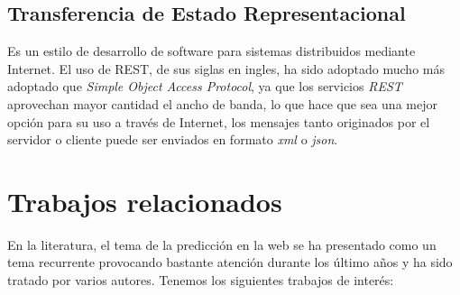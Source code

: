 \subsection{Transferencia de Estado Representacional}

Es un estilo de desarrollo de software para sistemas distribuidos mediante Internet. El uso de REST, de sus siglas en ingles, ha sido adoptado mucho más adoptado que  \emph{Simple Object Access Protocol}, ya que los servicios \emph{REST} aprovechan mayor cantidad el ancho de banda, lo que hace que sea una mejor opción para su uso a través de Internet, los mensajes tanto originados por el servidor o cliente puede ser enviados en formato \emph{xml} o \emph{json}. 



\section{Trabajos relacionados}

En la literatura, el tema de la predicción en la web se ha presentado como un tema recurrente provocando bastante atención durante los último años y ha sido tratado por 
varios autores. Tenemos los siguientes trabajos de interés:





